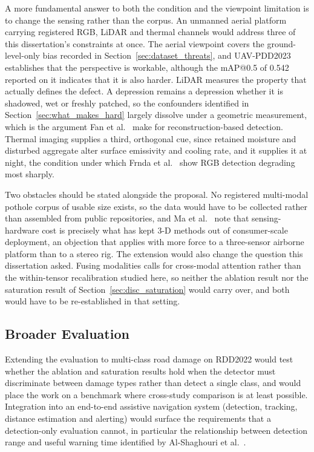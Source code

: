 \documentclass[MScCS]{uccthesis}
\begin{document}
A more fundamental answer to both the condition and the viewpoint limitation is
to change the sensing rather than the corpus. An unmanned aerial platform
carrying registered RGB, LiDAR and thermal channels would address three of this
dissertation's constraints at once. The aerial viewpoint covers the
ground-level-only bias recorded in Section~\ref{sec:dataset_threats}, and
UAV-PDD2023 \parencite{pan2025realtime} establishes that the perspective is
workable, although the mAP@0.5 of 0.542 reported on it indicates that it is
also harder. LiDAR measures the property that actually defines the defect. A
depression remains a depression whether it is shadowed, wet or freshly patched,
so the confounders identified in Section~\ref{sec:what_makes_hard} largely
dissolve under a geometric measurement, which is the argument Fan et
al.~\parencite{fan2022rethinking} make for reconstruction-based detection.
Thermal imaging supplies a third, orthogonal cue, since retained moisture and
disturbed aggregate alter surface emissivity and cooling rate, and it supplies
it at night, the condition under which Frnda et
al.~\parencite{frnda2024analysis} show RGB detection degrading most sharply.

Two obstacles should be stated alongside the proposal. No registered
multi-modal pothole corpus of usable size exists, so the data would have to be
collected rather than assembled from public repositories, and Ma et
al.~\parencite{ma2022computer} note that sensing-hardware cost is precisely
what has kept 3-D methods out of consumer-scale deployment, an objection that
applies with more force to a three-sensor airborne platform than to a stereo
rig. The extension would also change the question this dissertation asked.
Fusing modalities calls for cross-modal attention rather than the within-tensor
recalibration studied here, so neither the ablation result nor the saturation
result of Section~\ref{sec:disc_saturation} would carry over, and both would
have to be re-established in that setting.

\subsection{Broader Evaluation}

Extending the evaluation to multi-class road damage on RDD2022
\parencite{arya2022rdd2022} would test whether the ablation and saturation
results hold when the detector must discriminate between damage types rather
than detect a single class, and would place the work on a benchmark where
cross-study comparison is at least possible. Integration into an end-to-end
assistive navigation system (detection, tracking, distance estimation and
alerting) would surface the requirements that a detection-only evaluation
cannot, in particular the relationship between detection range and useful
warning time identified by Al-Shaghouri et
al.~\parencite{alshaghouri2021realtime}.
\end{document}
